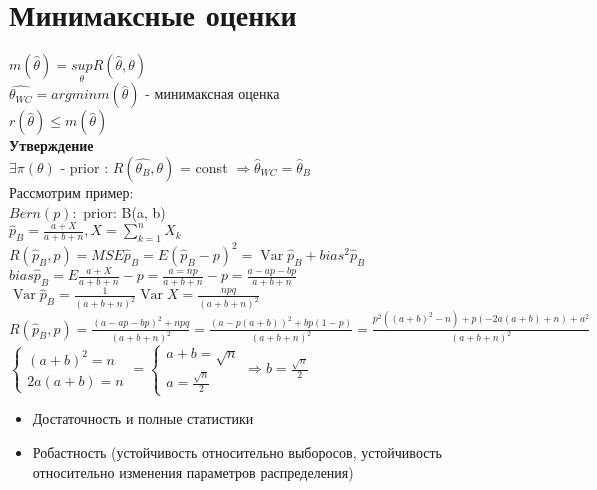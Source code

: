 \documentclass{article}
\newcommand\0{\mathbb{0}}
\DeclareMathOperator{\Var}{Var}
\newcommand\1{\mathbb{1}}
\newcommand{\Rto}{\Rightarrow}
\begin{document}
\section{Минимаксные оценки}
$m(\widehat{\theta}) = \underset{\theta}{sup} R(\widehat{\theta}, \theta)$\\
$\widehat{\theta_{WC}} = argmin m(\widehat{\theta})$ - минимаксная оценка\\
$r(\widehat{\theta}) \leq m(\widehat{\theta})$\\
\textbf{Утверждение}\\
$\exists \pi(\theta)$ - prior : $R(\widehat{\theta_B}, \theta)$ = const $\Rto \widehat{\theta}_{WC} = \widehat{\theta}_B$\\
Рассмотрим пример:\\
$Bern(p):$ prior: B(a, b)\\
$\widehat{p}_B = \frac{a + X}{a + b + n}, X = \displaystyle\sum_{k = 1}^n X_k$\\
$R(\widehat{p}_B, p) = MSE \widehat{p}_B = E(\widehat{p}_B - p)^2 = \Var \widehat{p}_B + bias^2\widehat{p}_B$\\
$bias \widehat{p}_B = E \frac{a + X}{a + b + n} - p = \frac{a = np}{a + b + n} - p = \frac{a - ap - bp}{a + b + n}$\\
$\Var \widehat{p}_B = \frac{1}{(a + b + n)^2}\Var X = \frac{npq}{(a + b + n)^2}$\\
$R(\widehat{p}_B, p) = \frac{(a - ap - bp)^2 + npq}{(a + b + n)^2} = \frac{(a - p(a + b))^2 + bp(1 - p)}{(a + b + n)^2} = \frac{p^2((a + b)^2 - n) + p(-2a(a + b) + n) + a^2}{(a + b + n)^2}$\\
$\begin{cases}
    (a + b)^2 = n\\
    2a(a + b) = n
\end{cases} = \begin{cases}
    a + b = \sqrt{n}\\
    a = \frac{\sqrt{n}}{2}
\end{cases} \Rto b = \frac{\sqrt{n}}{2}$\\
\begin{itemize}
    \item Достаточность и полные статистики
    \item Робастность (устойчивость относительно выборосов, устойчивость относительно изменения параметров распределения)
\end{itemize}
\end{document}
